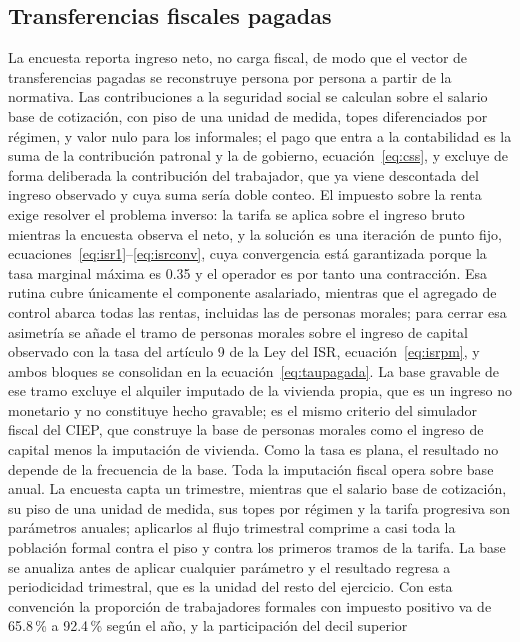\documentclass[11pt,a4paper]{article}
\begin{document}
\subsection{Transferencias fiscales pagadas}
La encuesta reporta ingreso neto, no carga fiscal, de modo que el vector de transferencias
pagadas se reconstruye persona por persona a partir de la normativa. Las contribuciones a la
seguridad social se calculan sobre el salario base de cotización, con piso de una unidad de
medida, topes diferenciados por régimen, y valor nulo para los informales; el pago que entra a
la contabilidad es la suma de la contribución patronal y la de gobierno, ecuación~\eqref{eq:css},
y excluye de forma deliberada la contribución del trabajador, que ya viene descontada del ingreso
observado y cuya suma sería doble conteo. El impuesto sobre la renta exige resolver el problema
inverso: la tarifa se aplica sobre el ingreso bruto mientras la encuesta observa el neto, y la
solución es una iteración de punto fijo, ecuaciones~\eqref{eq:isr1}--\eqref{eq:isrconv}, cuya
convergencia está garantizada porque la tasa marginal máxima es 0.35 y el operador es por tanto
una contracción. Esa rutina cubre únicamente el componente asalariado, mientras que el agregado
de control abarca todas las rentas, incluidas las de personas morales; para cerrar esa asimetría
se añade el tramo de personas morales sobre el ingreso de capital observado con la tasa del
artículo 9 de la Ley del ISR, ecuación~\eqref{eq:isrpm}, y ambos bloques se consolidan en la
ecuación~\eqref{eq:taupagada}. La base gravable de ese tramo excluye el alquiler imputado de la
vivienda propia, que es un ingreso no monetario y no constituye hecho gravable; es el mismo
criterio del simulador fiscal del CIEP, que construye la base de personas morales como el ingreso
de capital menos la imputación de vivienda. Como la tasa es plana, el resultado no depende de la
frecuencia de la base.
Toda la imputación fiscal opera sobre base anual. La encuesta capta un trimestre, mientras que el
salario base de cotización, su piso de una unidad de medida, sus topes por régimen y la tarifa
progresiva son parámetros anuales; aplicarlos al flujo trimestral comprime a casi toda la
población formal contra el piso y contra los primeros tramos de la tarifa. La base se anualiza
antes de aplicar cualquier parámetro y el resultado regresa a periodicidad trimestral, que es la
unidad del resto del ejercicio. Con esta convención la proporción de trabajadores formales con
impuesto positivo va de 65.8\,\% a 92.4\,\% según el año, y la participación del decil superior
\end{document}

